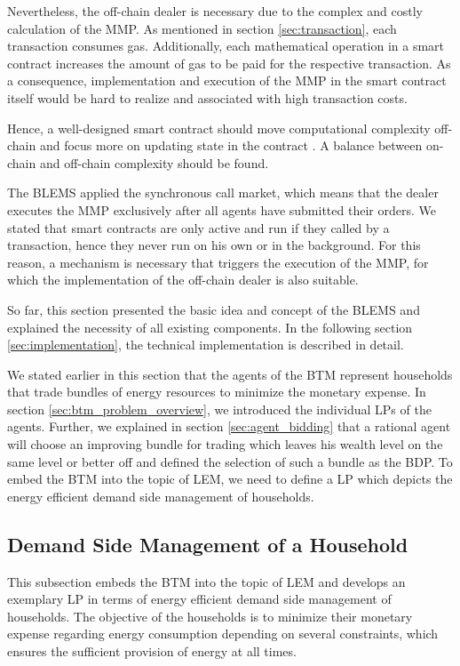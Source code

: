 Nevertheless, the off-chain dealer is necessary due to the complex and costly calculation of the MMP.
As mentioned in section \ref{sec:transaction}, each transaction consumes gas. Additionally, each mathematical operation in a smart contract
increases the amount of gas to be paid for the respective transaction. As a consequence, implementation and execution of the MMP
in the smart contract itself would be hard to realize and associated with high transaction costs. 

Hence, a well-designed smart contract should move computational complexity off-chain
and focus more on updating state in the contract . A balance between on-chain
and off-chain complexity should be found.

The BLEMS applied the synchronous call market, which means that the dealer executes the MMP exclusively after all agents 
have submitted their orders.
We stated that smart contracts are only active and run if they called by a transaction,
hence they never run on his own or in the background.
For this reason, a mechanism is necessary that triggers the execution of the 
MMP, for which the implementation of the off-chain dealer is also suitable.

So far, this section presented the basic idea and concept of the BLEMS
and explained the necessity of all existing components. In the following section \ref{sec:implementation}, 
the technical implementation is described in detail. 

We stated earlier in this section that the agents of the BTM represent households
that trade bundles of energy resources to minimize the monetary expense. 
In section \ref{sec:btm_problem_overview}, we introduced the individual LPs of the agents.
Further, we explained in section \ref{sec:agent_bidding} that a rational agent will choose an improving bundle for 
trading which leaves his wealth level on the same level or better off and defined the selection of such a bundle 
as the BDP.
To embed the BTM into the topic of LEM, we need to define 
a LP which depicts the energy efficient demand side management of households.

\subsection{Demand Side Management of a Household}
This subsection embeds the BTM into the topic of LEM and develops
an exemplary LP in terms of energy efficient demand side management of households. 
The objective of the households is to minimize their monetary expense regarding energy consumption depending
on several constraints, which ensures the sufficient provision of energy at all times.

